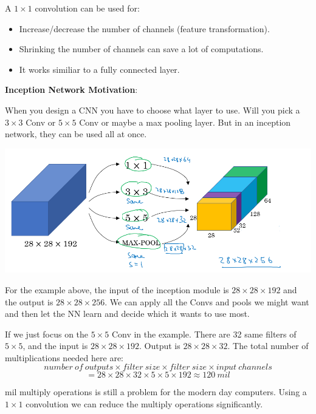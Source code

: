 \documentclass{article}
\begin{document}
\noindent A \(1 \times 1\) convolution can be used for:

\begin{itemize}
    \item Increase/decrease the number of channels (feature transformation).
    \item Shrinking the number of channels can save a lot of computations.
    \item It works similiar to a fully connected layer.
\end{itemize}

\noindent \textbf{Inception Network Motivation}:

\noindent When you design a CNN you have to choose what layer to use. Will you pick a \(3 \times 3\) Conv or \(5 \times 5\) Conv or maybe a max pooling layer. But in an inception network, they can be used all at once.

\begin{center}
\includegraphics[scale=0.3]{./images/inception_motivation.png}
\end{center}

\noindent For the example above, the input of the inception module is \(28 \times 28 \times 192\) and the output is \(28 \times 28 \times 256\). We can apply all the Convs and pools we might want and then let the NN learn and decide which it wants to use most.

\bigskip

\noindent If we just focus on the \(5 \times 5\) Conv in the example. There are 32 same filters of \(5 \times 5\), and the input is \(28 \times 28 \times 192\). Output is \(28 \times 28 \times 32\). The total number of multiplications needed here are:
\[number \ of \ outputs \times filter \ size \times filter \ size \times input \ channels\]
\[= 28 \times 28 \times 32 \times 5 \times 5 \times 192 \approx 120 \ mil\]

 mil multiply operations is still a problem for the modern day computers. Using a \(1 \times 1\) convolution we can reduce the multiply operations significantly.
\end{document}
